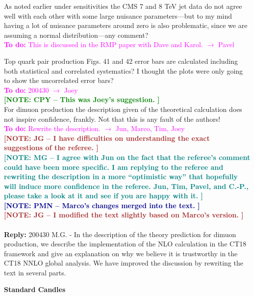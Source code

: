 \documentclass[aps,prd,amsmath,nofootinbib,floatfix,fleqn]{revtex4}
\newcommand{\TODO}[1]{\textcolor{magenta}{
\quad\vspace{3pt} \\ {\bf To do:} #1 \\
}}
\newcommand{\REPLY}[1]{\textcolor{redish}{\quad \\
{\bf Reply:} #1 \\
}}
\newcommand{\NOTECPY}[1]{\textcolor{green}{ \bf[NOTE: CPY -- #1 ]}}
\newcommand{\NOTEPN}[1]{\textcolor{darkblue}{ \bf[NOTE: PMN -- #1 ]}}
\newcommand{\NOTEJG}[1]{\textcolor{brown}{ \bf[NOTE: JG -- #1 ]}}
\newcommand{\NOTEMG}[1]{\textcolor{teal}{ \bf[NOTE: MG -- #1 ]}}
\begin{document}
\noindent
As noted earlier under sensitivities the CMS 7 and 8 TeV jet data do not agree well with each other with some large nuisance parameters—but to my mind having a lot of nuisance parameters around zero is also problematic, since we are assuming a normal distribution—any comment?  
\TODO{This is discussed in the RMP paper with Dave and Karol. $\to$ Pavel}


\noindent
Top quark pair production Figs. 41 and 42 error bars are calculated including both statistical and correlated systematics? I thought the plots were only going to show the uncorrelated error bars?  
\TODO{200430 $\to$  Joey}
\NOTECPY{This was Joey's suggestion.}\\

\noindent
For dimuon production the description given of the theoretical calculation does not inspire confidence, frankly. Not that this is any fault of the authors!  
\TODO{Rewrite the description. $\to$ Jun, Marco, Tim, Joey}
\NOTEJG{I have difficulties on understanding the exact suggestions of the referee.}\\
\NOTEMG{I agree with Jun on the fact that the referee's comment could have been more specific.
I am replying to the referee and rewriting the description in a more ``optimistic way'' that hopefully will induce more confidence in the referee.
Jun, Tim, Pavel, and C.-P., please take a look at it and see if you are happy with it.}\\
\NOTEPN{Marco's changes merged into the text.}\\
\NOTEJG{I modified the text slightly based on Marco's version.}\\
\REPLY{200430 M.G. - In the description of the theory prediction for dimuon production, we describe the implementation of the NLO calculation in the CT18 framework and give an
explanation on why we believe it is trustworthy in the CT18 NNLO global analysis. We have improved the discussion by rewriting the text in several parts.}


{\bf Standard Candles}
\end{document}
